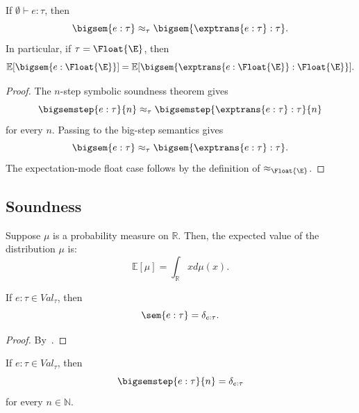 \begin{theorem}
  If $\emptyset \vdash e : \tau$, then
  \[
    \bigsem{e : \tau}
    \approx_\tau
    \bigsem{\exptrans{e : \tau} : \tau}.
  \]
  In particular, if $\tau = \Float{\E}$, then
  \[
    \mathbb{E}[\bigsem{e : \Float{\E}}]
    =
    \mathbb{E}[\bigsem{\exptrans{e : \Float{\E}} : \Float{\E}}].
  \]
\end{theorem}

\begin{proof}
  The $n$-step symbolic soundness theorem gives
  \[
    \bigsemstep{e : \tau}{n}
    \approx_\tau
    \bigsemstep{\exptrans{e : \tau} : \tau}{n}
  \]
  for every $n$.  Passing to the big-step semantics gives
  \[
    \bigsem{e : \tau}
    \approx_\tau
    \bigsem{\exptrans{e : \tau} : \tau}.
  \]
  The expectation-mode float case follows by the definition of
  $\approx_{\Float{\E}}$.
\end{proof}

\subsection{Soundness}
\begin{definition}
  Suppose $\mu$ is a probability measure on $\mathbb{R}$. Then, the expected value of the distribution $\mu$ is:
  \[
    \mathbb{E}[\mu] = \int_{\mathbb{R}} x d\mu(x).
  \]
\end{definition}

\begin{lemma}\label{lem:one-step-value}
  If $e : \tau \in Val_{\tau}$, then 
  \[
    \sem{e : \tau} = \delta_{e : \tau}.
  \]
\end{lemma}

\begin{proof}
  By~.
\end{proof}

\begin{lemma}\label{lem:nstep-value}
  If $e : \tau \in Val_{\tau}$, then
  \[
    \bigsemstep{e : \tau}{n} = \delta_{e : \tau}
  \]
  for every $n \in \mathbb{N}$.
\end{lemma}


